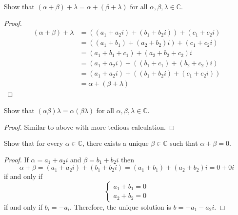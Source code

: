 \begin{exercise} \label{1.A.5}
    Show that \( (\alpha + \beta) + \lambda = \alpha + (\beta + \lambda) \) for all \( \alpha, \beta, \lambda \in \mathbb{C} \).
        
    \begin{proof}
        \begin{align*}
            (\alpha + \beta) + \lambda &= ((a_1+a_2i) + (b_1+b_2i)) + (c_1+c_2i) \\
            &= ((a_1+b_1)+(a_2+b_2)i) + (c_1+c_2i) \\
            &= (a_1+b_1+c_1) + (a_2+b_2+c_2)i \\
            &= (a_1+a_2i) + ((b_1+c_1)+(b_2+c_2)i) \\
            &= (a_1 + a_2i) + ((b_1+b_2i)+(c_1+c_2i)) \\
            &= \alpha + (\beta + \lambda)
        \end{align*}
    \end{proof}
\end{exercise}

\begin{exercise} \label{1.A.6}
    Show that \( (\alpha \beta)\lambda = \alpha(\beta \lambda) \) for all \( \alpha,\beta, \lambda \in \mathbb{C} \).
    
    \begin{proof}
        Similar to above with more tedious calculation.
    \end{proof}
\end{exercise}

\begin{exercise} \label{1.A.7}
    Show that for every \( \alpha \in \mathbb{C} \), there exists a unique \( \beta \in \mathbb{C} \) such that \( \alpha + \beta = 0 \).
    
    \begin{proof}
        If \( \alpha = a_1+a_2i \) and \( \beta = b_1+b_2i \) then
        \[ \alpha + \beta = (a_1+a_2i) + (b_1+b_2i) = (a_1+b_1)+(a_2+b_2)i = 0+0i \]
        if and only if
        \[
        \begin{cases}
        a_1+b_1 = 0 \\
        a_2+b_2 = 0
        \end{cases}
        \]
        if and only if \( b_i = -a_i \). Therefore, the unique solution is \( b= -a_1-a_2i \).
    \end{proof}
\end{exercise}

